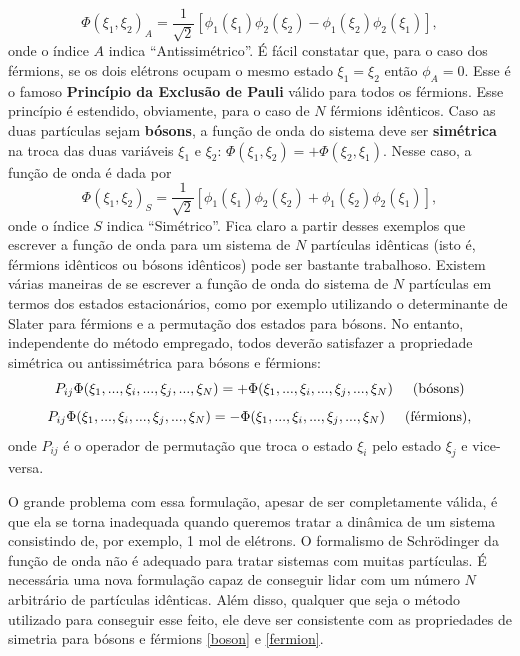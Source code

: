 \documentclass{article}
\begin{document}
\begin{equation}
    \Phi(\xi_1,\xi_2)_A = \frac{1}{\sqrt{2}}[\phi_1 (\xi_1) \phi_2 (\xi_2) - \phi_1 (\xi_2) \phi_2 (\xi_1)],
\end{equation}
onde o índice $A$ indica ``Antissimétrico''. É fácil constatar que, para o caso dos férmions, se os dois elétrons ocupam o mesmo estado $\xi_1 = \xi_2$ então $\phi_A = 0$. Esse é o famoso \textbf{Princípio da Exclusão de Pauli} válido para todos os férmions. Esse princípio é estendido, obviamente, para o caso de $N$ férmions idênticos. Caso as duas partículas sejam \textbf{bósons}, a função de onda do sistema deve ser \textbf{simétrica} na troca das duas variáveis $\xi_1$ e $\xi_2$: $\Phi(\xi_1,\xi_2) = +\Phi(\xi_2,\xi_1)$. Nesse caso, a função de onda é dada por
\begin{equation}
    \Phi(\xi_1,\xi_2)_S = \frac{1}{\sqrt{2}}[\phi_1 (\xi_1) \phi_2 (\xi_2) + \phi_1 (\xi_2) \phi_2 (\xi_1)],
\end{equation}
onde o índice $S$ indica ``Simétrico''. Fica claro a partir desses exemplos que escrever a função de onda para um sistema de $N$ partículas idênticas (isto é, férmions idênticos ou bósons idênticos) pode ser bastante trabalhoso. Existem várias maneiras de se escrever a função de onda do sistema de $N$ partículas em termos dos estados estacionários, como por exemplo utilizando o determinante de Slater para férmions e a permutação dos estados para bósons. No entanto, independente do método empregado, todos deverão satisfazer a propriedade simétrica ou antissimétrica para bósons e férmions:
\begin{equation}
    P_{ij}\Phi(\xi_1,...,\xi_i,...,\xi_j,...,\xi_N) = + \Phi(\xi_1,...,\xi_i,...,\xi_j,...,\xi_N) \hspace{0.5cm} \text{(bósons)}
    \label{boson}
\end{equation}
\begin{equation}
    P_{ij}\Phi(\xi_1,...,\xi_i,...,\xi_j,...,\xi_N) = - \Phi(\xi_1,...,\xi_i,...,\xi_j,...,\xi_N) \hspace{0.5cm} \text{(férmions)},
    \label{fermion}
\end{equation}
onde $P_{ij}$ é o operador de permutação que troca o estado $\xi_i$ pelo estado $\xi_j$ e vice-versa.

O grande problema com essa formulação, apesar de ser completamente válida, é que ela se torna inadequada quando queremos tratar a dinâmica de um sistema consistindo de, por exemplo, 1 mol de elétrons. O formalismo de Schrödinger da função de onda não é adequado para tratar sistemas com muitas partículas. É necessária uma nova formulação capaz de conseguir lidar com um número $N$ arbitrário de partículas idênticas. Além disso, qualquer que seja o método utilizado para conseguir esse feito, ele deve ser consistente com as propriedades de simetria para bósons e férmions \eqref{boson} e \eqref{fermion}.
\end{document}
